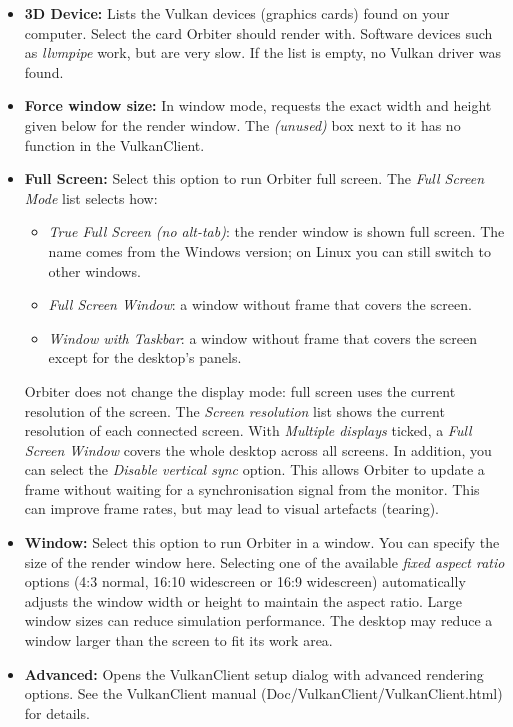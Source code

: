 \documentclass[Orbiter User Manual.tex]{subfiles}
\begin{document}
\begin{itemize}
\item \textbf{3D Device:} Lists the Vulkan devices (graphics cards) found on your computer. Select the card Orbiter should render with. Software devices such as \textit{llvmpipe} work, but are very slow. If the list is empty, no Vulkan driver was found.
\item \textbf{Force window size:} In window mode, requests the exact width and height given below for the render window. The \textit{(unused)} box next to it has no function in the VulkanClient.
\item \textbf{Full Screen:} Select this option to run Orbiter full screen. The \textit{Full Screen Mode} list selects how:
\begin{itemize}
\item \textit{True Full Screen (no alt-tab)}: the render window is shown full screen. The name comes from the Windows version; on Linux you can still switch to other windows.
\item \textit{Full Screen Window}: a window without frame that covers the screen.
\item \textit{Window with Taskbar}: a window without frame that covers the screen except for the desktop's panels.
\end{itemize}
Orbiter does not change the display mode: full screen uses the current resolution of the screen. The \textit{Screen resolution} list shows the current resolution of each connected screen.\newline
With \textit{Multiple displays} ticked, a \textit{Full Screen Window} covers the whole desktop across all screens.\newline
In addition, you can select the \textit{Disable vertical sync} option. This allows Orbiter to update a frame without waiting for a synchronisation signal from the monitor. This can improve frame rates, but may lead to visual artefacts (tearing).
\item \textbf{Window:} Select this option to run Orbiter in a window. You can specify the size of the render window here. Selecting one of the available \textit{fixed aspect ratio} options (4:3 normal, 16:10 widescreen or 16:9 widescreen) automatically adjusts the window width or height to maintain the aspect ratio. Large window sizes can reduce simulation performance. The desktop may reduce a window larger than the screen to fit its work area.
\item \textbf{Advanced:} Opens the VulkanClient setup dialog with advanced rendering options. See the VulkanClient manual (Doc/VulkanClient/VulkanClient.html) for details.
\end{itemize}
\end{document}
